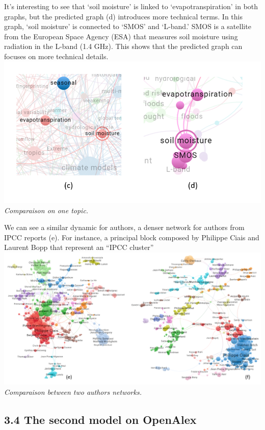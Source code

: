 \documentclass[
]{article}
\begin{document}
It's interesting to see that `soil moisture' is linked to
`evapotranspiration' in both graphs, but the predicted graph (d)
introduces more technical terms. In this graph, `soil moisture' is
connected to `SMOS' and `L-band.' SMOS is a satellite from the European
Space Agency (ESA) that measures soil moisture using radiation in the
L-band (1.4 GHz). This shows that the predicted graph can focuses on
more technical details.
\includegraphics{./images/teds_network_topics2_sensors.png}
\emph{Comparaison on one topic.}

We can see a similar dynamic for authors, a denser network for authors
from IPCC reports (e). For instance, a principal block composed by
Philippe Ciais and Laurent Bopp that represent an ``IPCC cluster''\\
\includegraphics{./images/teds_network_authors2.png} \emph{Comparaison
between two authors networks.}

\hypertarget{the-second-model-on-openalex}{%
\subsection{3.4 The second model on
OpenAlex}\label{the-second-model-on-openalex}}
\end{document}
